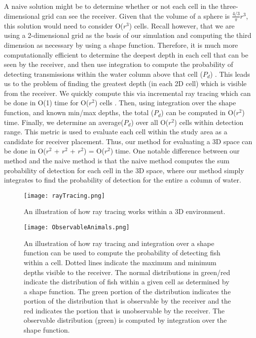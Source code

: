 \label{evaluatingSensorEmplacements}
A naive solution might be to determine whether or not each cell in the three-dimensional grid can see the receiver.  Given that the volume of a sphere is $\frac{4/3}\pi r^{3}$, this solution would need to consider O($r^{3}$) cells.  Recall however, that we are using a 2-dimensional grid as the basis of our simulation and computing the third dimension as necessary by using a shape function.  Therefore, it is much more computationally efficient to determine the deepest depth in each cell that can be seen by the receiver, and then use integration to compute the probability of detecting transmissions within the water column above that cell ($P_{d}$) .  This leads us to the problem of finding the greatest depth (in each 2D cell) which is visible from the receiver.  We quickly compute this via incremental ray tracing which can be done in O(1) time for O($r^{2}$) cells \cite{Akbarzadeh2013}.   Then, using integration over the shape function, and known min/max depths, the total ($P_{d}$) can be computed in O($r^{2}$) time.  Finally, we determine an average($P_{d}$)  over all O($r^{2}$) cells within detection range.  This metric is used to evaluate each cell within the study area as a candidate for receiver placement.  Thus, our method for evaluating a 3D space can be done in  O($r^{2}$ + $r^{2}$ + $r^{2}$) = O($r^{2}$) time.  One notable difference between our method and the naive method is that the naive method computes the sum probability of detection for each cell in the 3D space, where our method simply integrates to find the probability of detection for the entire a column of water.  


\begin{figure}[t]
	\label{rayTracing}
	\centering
	\texttt{[image: rayTracing.png]}
	\caption{An illustration of how ray tracing works within a 3D environment. \cite{Akbarzadeh2013}}
\end{figure}

\begin{figure}[t]
	\label{observableAnimals}
	\centering
	\texttt{[image: ObservableAnimals.png]}
	\caption{An illustration of how ray tracing and integration over a shape function can be used to compute the probability of detecting fish within a cell.  Dotted lines indicate the maximum and minimum depths visible to the receiver.  The normal distributions in green/red indicate the distribution of fish within a given cell as determined by a shape function.  The green portion of the distribution indicates the portion of the distribution that is observable by the receiver and the red indicates the portion that is unobservable by the receiver.  The observable distribution (green) is computed by integration over the shape function.}
\end{figure}


